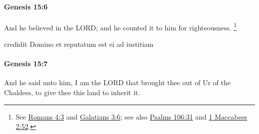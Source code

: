 		\paragraph{Genesis 15:6} %
			\label{GENESIS-15-6}

			And he believed in the LORD; and he counted it to him for righteousness.%
				\footnote{%
					See \hyperref[ROMANS-4-3]{Romans 4:3} and \hyperref[GALATIANS-3-6]{Galatians 3:6}; see also \hyperref[PSALMS-106-31]{Psalms 106:31} and \hyperref[1MACCABEES-2-52]{1 Maccabees 2:52}.
					}

			\begin{framed}
			\scriptsize
				\begin{compactdesc}
					\item[LXX] 
					\item[BSV] credidit Domino et reputatum est ei ad iustitiam
				\end{compactdesc}
			\end{framed}

		\paragraph{Genesis 15:7} %
			\label{GENESIS-15-7}

			And he said unto him, I am the LORD that brought thee out of Ur of the Chaldees, to give thee this land to inherit it.


